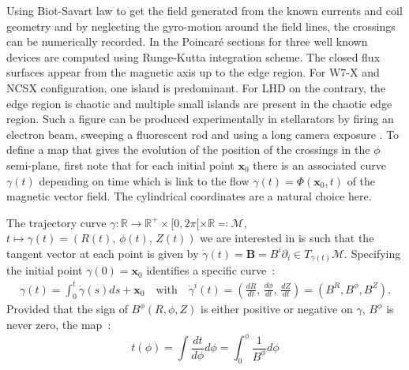 Using Biot-Savart law to get the field generated from the known currents and coil geometry and by neglecting the gyro-motion around the field lines, the crossings can be numerically recorded. In  the Poincaré sections for three well known devices are computed using Runge-Kutta integration scheme. The closed flux surfaces appear from the magnetic axis up to the edge region. For W7-X and NCSX configuration, one island is predominant. For LHD on the contrary, the edge region is chaotic and multiple small islands are present in the chaotic edge region. Such a figure can be produced experimentally in stellarators by firing an electron beam, sweeping a fluorescent rod and using a long camera exposure \cite{pedersen_confirmation_2016}. To define a map that gives the evolution of the position of the crossings in the $\phi$ semi-plane, first note that for each initial point $\textbf{x}_0$ there is an associated curve $\gamma(t)$ depending on time which is link to the flow $\gamma(t) = \Phi(\textbf{x}_0, t)$ of the magnetic vector field. The cylindrical coordinates are a natural choice here.

\noindent
{}

The trajectory curve $\gamma : \mathbb{R}\rightarrow\mathbb{R}^+\times[0,2\pi[\times\mathbb{R} \eqqcolon \mathcal{M}$, $t \mapsto \gamma(t) = (R(t),\,\phi(t),\,Z(t))$ we are interested in is such that the tangent vector at each point is given by $\dot{\gamma}(t)= \textbf{B} = B^i\partial_i \in T_{\gamma(t)}\mathcal{M}$. Specifying the initial point $\gamma(0) = \textbf{x}_0$ identifies a specific curve~:
\begin{align*}
    \gamma(t) = \int_0^t\dot{\gamma}(s)ds + \textbf{x}_0 \quad \text{with} \quad   \dot{\gamma}^i(t)= (\frac{dR}{dt},\,\frac{d\phi}{dt},\,\frac{dZ}{dt}) = (B^R, B^\phi, B^Z).
\end{align*}
Provided that the sign of $B^\phi(R, \phi, Z)$ is either positive or negative on $\gamma$, $B^\phi$ is never zero, the map~:
\begin{equation*}
    t(\phi) = \int \frac{dt}{d\phi}d\phi = \int_0^\phi \frac{1}{B^\phi}d\phi
\end{equation*}

